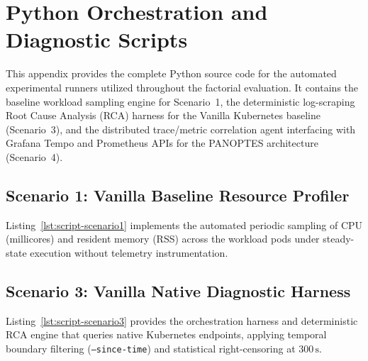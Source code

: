 \chapter{Python Orchestration and Diagnostic Scripts}
\label{app:python-scripts}

This appendix provides the complete Python source code for the automated experimental runners utilized throughout the factorial evaluation. It contains the baseline workload sampling engine for Scenario~1, the deterministic log-scraping Root Cause Analysis (RCA) harness for the Vanilla Kubernetes baseline (Scenario~3), and the distributed trace/metric correlation agent interfacing with Grafana Tempo and Prometheus APIs for the PANOPTES architecture (Scenario~4).

\section{Scenario 1: Vanilla Baseline Resource Profiler}
\label{sec:app-script-scenario1}

Listing~\ref{lst:script-scenario1} implements the automated periodic sampling of CPU (millicores) and resident memory (RSS) across the workload pods under steady-state execution without telemetry instrumentation.



\section{Scenario 3: Vanilla Native Diagnostic Harness}
\label{sec:app-script-scenario3}

Listing~\ref{lst:script-scenario3} provides the orchestration harness and deterministic RCA engine that queries native Kubernetes endpoints, applying temporal boundary filtering (\texttt{--since-time}) and statistical right-censoring at $300\,\text{s}$.



